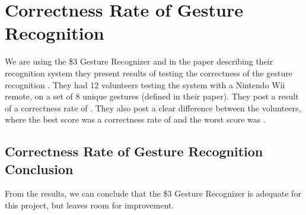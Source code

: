 \section{Correctness Rate of Gesture Recognition}\label{sec:gesturecorrectness}
We are using the \$3 Gesture Recognizer and in the paper describing their recognition system they present results of testing the correctness of the gesture recognition \cite{threedollar}.
They had \num{12} volunteers testing the system with a Nintendo Wii remote, 
on a set of \num{8} unique gestures (defined in their paper).
They post a result of a correctness rate of . 
They also post a clear difference between the volunteers, 
where the best score was a correctness rate of  and the worst score was . 
\subsection{Correctness Rate of Gesture Recognition Conclusion}
From the results, we can conclude that the \$3 Gesture Recognizer is adequate for this project, but leaves room for improvement. 
